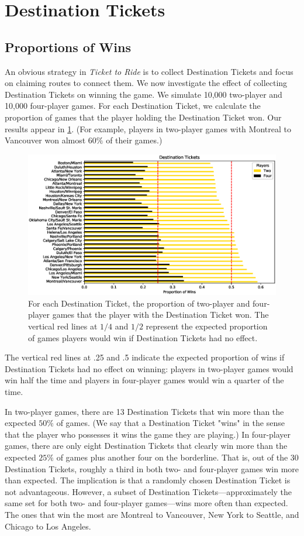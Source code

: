 \section{Destination Tickets}
\label{sec:tickets}
\subsection{Proportions of Wins}
\label{sec:winning}
An obvious strategy in \textit{Ticket to Ride} is to collect
Destination Tickets and focus on claiming routes to connect them.
We now investigate the effect of collecting Destination Tickets
on winning the game.
We simulate 10,000 two-player and 10,000 four-player games.
For each Destination Ticket, we calculate the proportion of 
games that the player holding the Destination Ticket won.
Our results appear in \cref{fig:tickets}.
(For example, players in two-player games with Montreal 
to Vancouver won almost $60\%$ of their games.)

\begin{figure}[H]
\centering
\includegraphics[scale=.6]{figures/destination_tickets}
\caption{For each Destination Ticket,
the proportion of two-player and four-player games that 
the player with the Destination Ticket won.
The vertical red lines at $1/4$ and $1/2$ represent
the expected proportion of games players would win
if Destination Tickets had no effect.}
\label{fig:tickets}
\end{figure}

The vertical red lines at .25 and .5 indicate
the expected proportion of wins if Destination Tickets
had no effect on winning: players in two-player games
would win half the time and players in four-player games
would win a quarter of the time.

In two-player games, there are 13 Destination Tickets 
that win more than the expected $50\%$ of games.
(We say that a Destination Ticket "wins" in the sense
that the player who possesses it wins the game they
are playing.)
In four-player games, there are only eight Destination Tickets
that clearly win more than the expected $25\%$ of games plus
another four on the borderline.
That is, out of the 30 Destination Tickets, roughly a third
in both two- and four-player games win more than expected.
The implication is that a randomly chosen Destination 
Ticket is not advantageous.
However, a subset of Destination Tickets---approximately the same
set for both two- and four-player games---wins more often than expected.
The ones that win the most are Montreal to Vancouver,
New York to Seattle, and Chicago to Los Angeles.

